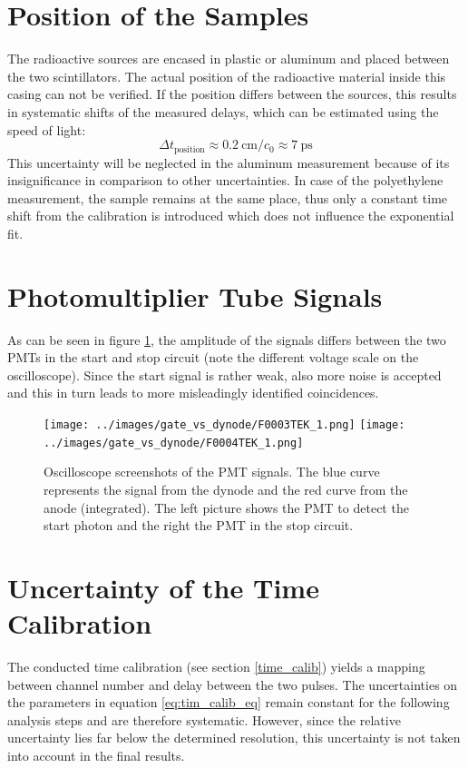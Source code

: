 \documentclass[
	paper=A4,
	parskip=full,
	chapterprefix=true,
	11pt,
	headings=normal,
	bibliography=totoc,
	listof=totoc,
	titlepage=on,
]{scrreprt}
\begin{document}
\section{Position of the Samples}
The radioactive sources are encased in plastic or aluminum and placed between the two scintillators. The actual position of the radioactive material inside this casing can not be verified. If the position differs between the sources, this results in systematic shifts of the measured delays, which can be estimated using the speed of light:
\begin{equation}
\Delta t_\textrm{position} \approx \SI{0.2}{\centi\meter} / c_0 \approx \SI{7}{\pico\second}   
\end{equation}
This uncertainty will be neglected in the aluminum measurement because of its insignificance in comparison to other uncertainties. In case of the polyethylene measurement, the sample remains at the same place, thus only a constant time shift from the calibration is introduced which does not influence the exponential fit.

\section{Photomultiplier Tube Signals}
As can be seen in figure \ref{fig:pmt_signals}, the amplitude of the signals differs between the two PMTs in the start and stop circuit (note the different voltage scale on the oscilloscope). Since the start signal is rather weak, also more noise is accepted and this in turn leads to more misleadingly identified coincidences.

\begin{figure}
	\centering
	\texttt{[image: ../images/gate\_vs\_dynode/F0003TEK\_1.png]}
	\texttt{[image: ../images/gate\_vs\_dynode/F0004TEK\_1.png]}
	\caption{Oscilloscope screenshots of the PMT signals. The blue curve represents the signal from the dynode and the red curve from the anode (integrated). The left picture shows the PMT to detect the start photon and the right the PMT in the stop circuit.}
	\label{fig:pmt_signals}
\end{figure}

\section{Uncertainty of the Time Calibration}
The conducted time calibration (see section \ref{time_calib}) yields a mapping between channel number and delay between the two pulses. The uncertainties on the parameters in equation \ref{eq:tim_calib_eq} remain constant for the following analysis steps and are therefore systematic. However, since the relative uncertainty lies far below the determined resolution, this uncertainty is not taken into account in the final results. 
\end{document}

